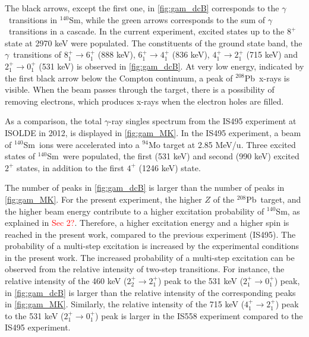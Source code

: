 \documentclass[twoside,english]{uiofysmaster/uiofysmaster}
\newcommand{\Sm}{$^{140}$Sm} %
\newcommand{\Pb}{$^{208}$Pb}
\newcommand{\ga}{$\gamma$}
\let\orgautoref\autoref
\renewcommand{\autoref}
        {%
		 \def\sectionautorefname{Section}%
		 \def\subsectionautorefname{Section}%
		 \def\subsubsectionautorefname{Section}%
		 \def\chapterautorefname{Chapter}%
          \orgautoref}
\begin{document}
The black arrows, except the first one, in \autoref{fig:gam_dcB} corresponds to the \ga\ transitions in \Sm, while the green arrows corresponds to the sum of \ga\ transitions in a cascade.
In the current experiment, excited states up to the $8^+$ state at 2970 keV were populated.
The constituents of the ground state band, the \ga\ transitions of $8_1^+ \rightarrow 6_1^+$ (888 keV), $6_1^+ \rightarrow 4_1^+$ (836 keV), $4_1^+ \rightarrow 2_1^+$ (715 keV) and $2_1^+ \rightarrow 0_1^+$ (531 keV) is observed in \autoref{fig:gam_dcB}.
At very low energy, indicated by the first black arrow below the Compton continuum, a peak of \Pb\ x-rays is visible.
When the beam passes through the target, there is a possibility of removing electrons, which produces x-rays when the electron holes are filled.

As a comparison, the total \ga-ray singles spectrum from the IS495 experiment at ISOLDE in 2012, is displayed in \autoref{fig:gam_MK}.
In the IS495 experiment, a beam of \Sm\ ions were accelerated into a $^{94}$Mo target at 2.85 MeV/u.
Three excited states of \Sm\ were populated, the first (531 keV) and second (990 keV) excited $2^+$ states, in addition to the first $4^+$ (1246 keV) state.

The number of peaks in \autoref{fig:gam_dcB} is larger than the number of peaks in \autoref{fig:gam_MK}.
For the present experiment, the higher $Z$ of the \Pb\ target, and the higher beam energy contribute to a higher excitation probability of \Sm, as explained in \textcolor{red}{Sec 2?}. 
Therefore, a higher excitation energy and a higher spin is reached in the present work, compared to the previous experiment (IS495).
The probability of a multi-step excitation is increased by the experimental conditions in the present work. 
The increased probability of a multi-step excitation can be observed from the relative intensity of two-step transitions. 
For instance, the relative intensity of the 460 keV ($2_2^+ \rightarrow 2_1^+$) peak to the 531 keV ($2_1^+ \rightarrow  0_1^+$) peak, in \autoref{fig:gam_dcB} is larger than the relative intensity of the corresponding peaks in \autoref{fig:gam_MK}.
Similarly, the relative intensity of the 715 keV ($4_1^+ \rightarrow  2_1^+$) peak to the 531 keV ($2_1^+ \rightarrow  0_1^+$) peak is larger in the IS558 experiment compared to the IS495 experiment.

\end{document}
